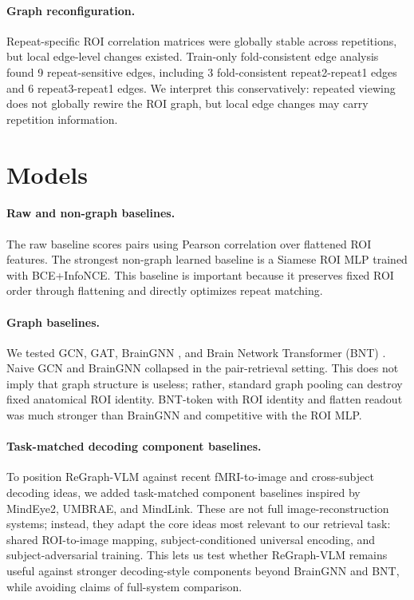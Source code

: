 \documentclass{article}
\begin{document}
\paragraph{Graph reconfiguration.}
Repeat-specific ROI correlation matrices were globally stable across repetitions, but local edge-level changes existed. Train-only fold-consistent edge analysis found 9 repeat-sensitive edges, including 3 fold-consistent repeat2-repeat1 edges and 6 repeat3-repeat1 edges. We interpret this conservatively: repeated viewing does not globally rewire the ROI graph, but local edge changes may carry repetition information.

\section{Models}

\paragraph{Raw and non-graph baselines.}
The raw baseline scores pairs using Pearson correlation over flattened ROI features. The strongest non-graph learned baseline is a Siamese ROI MLP trained with BCE+InfoNCE. This baseline is important because it preserves fixed ROI order through flattening and directly optimizes repeat matching.

\paragraph{Graph baselines.}
We tested GCN, GAT, BrainGNN \citep{li2021braingnn}, and Brain Network Transformer (BNT) \citep{kan2022bnt}. Naive GCN and BrainGNN collapsed in the pair-retrieval setting. This does not imply that graph structure is useless; rather, standard graph pooling can destroy fixed anatomical ROI identity. BNT-token with ROI identity and flatten readout was much stronger than BrainGNN and competitive with the ROI MLP.

\paragraph{Task-matched decoding component baselines.}
To position ReGraph-VLM against recent fMRI-to-image and cross-subject decoding ideas, we added task-matched component baselines inspired by MindEye2, UMBRAE, and MindLink. These are not full image-reconstruction systems; instead, they adapt the core ideas most relevant to our retrieval task: shared ROI-to-image mapping, subject-conditioned universal encoding, and subject-adversarial training. This lets us test whether ReGraph-VLM remains useful against stronger decoding-style components beyond BrainGNN and BNT, while avoiding claims of full-system comparison.
\end{document}
